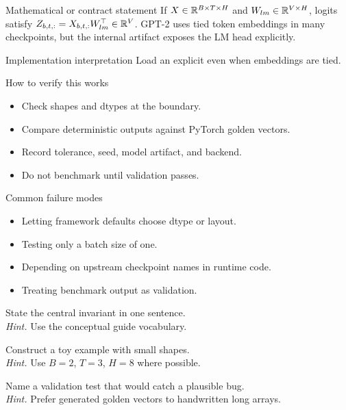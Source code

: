 \begin{definitionbox}{Mathematical or contract statement}
If \(X\in\mathbb{R}^{B\times T\times H}\) and \(W_{lm}\in\mathbb{R}^{V\times H}\), logits satisfy \(Z_{b,t,:}=X_{b,t,:}W_{lm}^{\top}\in\mathbb{R}^V\). GPT-2 uses tied token embeddings in many checkpoints, but the internal artifact exposes the LM head explicitly.
\end{definitionbox}

\begin{implementationbox}{Implementation interpretation}
Load an explicit  even when embeddings are tied.
\end{implementationbox}

\begin{verificationbox}{How to verify this works}
\begin{itemize}
\item Check shapes and dtypes at the boundary.
\item Compare deterministic outputs against PyTorch golden vectors.
\item Record tolerance, seed, model artifact, and backend.
\item Do not benchmark until validation passes.
\end{itemize}
\end{verificationbox}

\begin{warningbox}{Common failure modes}
\begin{itemize}
\item Letting framework defaults choose dtype or layout.
\item Testing only a batch size of one.
\item Depending on upstream checkpoint names in runtime code.
\item Treating benchmark output as validation.
\end{itemize}
\end{warningbox}

\begin{chapterexercises}
\item State the central invariant in one sentence.\\
\textit{Hint.} Use the conceptual guide vocabulary.
\item Construct a toy example with small shapes.\\
\textit{Hint.} Use $B=2$, $T=3$, $H=8$ where possible.
\item Name a validation test that would catch a plausible bug.\\
\textit{Hint.} Prefer generated golden vectors to handwritten long arrays.
\end{chapterexercises}

